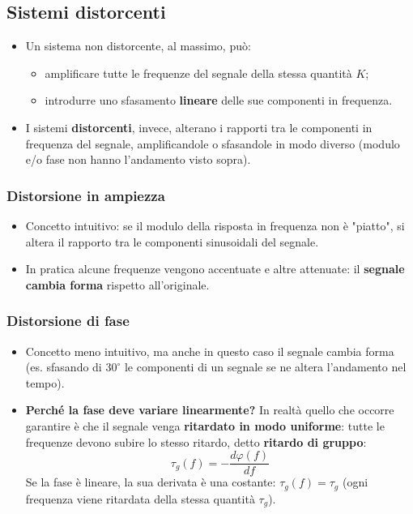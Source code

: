 \documentclass[12pt, a4paper]{article}
\begin{document}
\subsection{Sistemi distorcenti}
\begin{itemize}
    \item Un sistema non distorcente, al massimo, può:
    \begin{itemize}
        \item amplificare tutte le frequenze del segnale della stessa quantità $K$;
        \item introdurre uno sfasamento \textbf{lineare} delle sue componenti in frequenza.
    \end{itemize}
    \item I sistemi \textbf{distorcenti}, invece, alterano i rapporti tra le componenti in frequenza del segnale, amplificandole o sfasandole in modo diverso (modulo e/o fase non hanno l'andamento visto sopra).
\end{itemize}

\subsubsection{Distorsione in ampiezza}
\begin{itemize}
    \item Concetto intuitivo: se il modulo della risposta in frequenza non è "piatto", si altera il rapporto tra le componenti sinusoidali del segnale.
    \item In pratica alcune frequenze vengono accentuate e altre attenuate: il \textbf{segnale cambia forma} rispetto all'originale.
\end{itemize}

\subsubsection{Distorsione di fase}
\begin{itemize}
    \item Concetto meno intuitivo, ma anche in questo caso il segnale cambia forma (es. sfasando di $30^\circ$ le componenti di un segnale se ne altera l'andamento nel tempo).
    \item \textbf{Perché la fase deve variare linearmente?} In realtà quello che occorre garantire è che il segnale venga \textbf{ritardato in modo uniforme}: tutte le frequenze devono subire lo stesso ritardo, detto \textbf{ritardo di gruppo}:
    $$\tau_g(f) = -\frac{d\varphi(f)}{df}$$
    Se la fase è lineare, la sua derivata è una costante: $\tau_g(f)=\tau_g$ (ogni frequenza viene ritardata della stessa quantità $\tau_g$).
\end{itemize}
\end{document}
